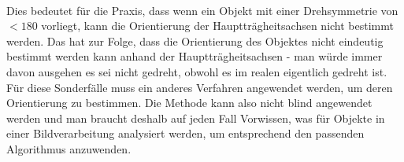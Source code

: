 \documentclass{ezb}
\begin{document}
\\
Dies bedeutet für die Praxis, dass wenn ein Objekt mit einer Drehsymmetrie von $< 180$ \degree vorliegt, kann die Orientierung der Hauptträgheitsachsen nicht bestimmt werden. Das hat zur Folge, dass die Orientierung des Objektes nicht eindeutig bestimmt werden kann anhand der Hauptträgheitsachsen - man würde immer davon ausgehen es sei nicht gedreht, obwohl es im realen eigentlich gedreht ist. Für diese Sonderfälle muss ein anderes Verfahren angewendet werden, um deren Orientierung zu bestimmen. Die Methode kann also nicht blind angewendet werden und man braucht deshalb auf jeden Fall Vorwissen, was für Objekte in einer Bildverarbeitung analysiert werden, um entsprechend den passenden Algorithmus anzuwenden.

\end{document}
